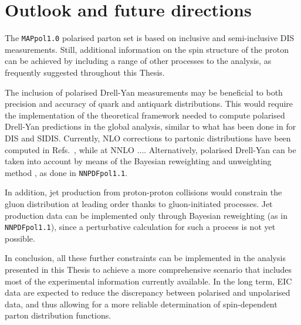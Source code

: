 \section{Outlook and future directions}
%
The \texttt{MAPpol1.0} polarised parton set is based on inclusive and semi-inclusive DIS measurements. Still, additional information on the spin structure of the proton can be achieved by including a range of other processes to the analysis, as frequently suggested throughout this Thesis.%

The inclusion of polarised Drell-Yan measurements may be beneficial to both precision and accuracy of quark and antiquark distributions. This would require the implementation of the theoretical framework needed to compute polarised Drell-Yan predictions in the global analysis, similar to what has been done in  for DIS and SIDIS. Currently, NLO corrections to partonic distributions have been computed in Refs.~\cite{Gehrmann:1997ez,Bonvini:2010tp}, while at NNLO ....  Alternatively, polarised Drell-Yan can be taken into account by means of the Bayesian reweighting and unweighting method \cite{Ball:2010gb, Ball:2011gg}, as done in \texttt{NNPDFpol1.1}.%

In addition, jet production from proton-proton collisions would constrain the gluon distribution at leading order thanks to gluon-initiated processes. Jet production data can be implemented only through Bayesian reweighting (as in \texttt{NNPDFpol1.1}), since a perturbative calculation for such a process is not yet possible.%

In conclusion, all these further constraints can be implemented in the analysis presented in this Thesis to achieve a more comprehensive scenario that includes most of the experimental information currently available. In the long term, EIC data are expected to reduce the discrepancy between polarised and unpolarised data, and thus allowing for a more reliable determination of spin-dependent parton distribution functions.